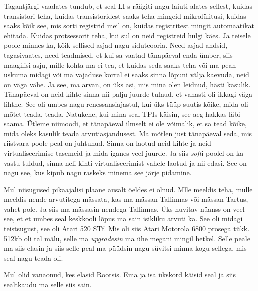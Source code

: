 Tagantjärgi  vaadates tundub, et  seal LI-s räägiti nagu laiuti alates sellest, 
kuidas transistori teha, kuidas transistoridest saaks teha mingeid 
mikrolülitusi, kuidas saaks kõik see, mis sorti registrid meil on, kuidas 
registritest mingit automaatikat ehitada. Kuidas protsessorit teha, kui sul on 
neid registreid hulgi käes. Ja  teisele  poole minnes ka, kõik sellised asjad 
nagu siduteooria. Need asjad andsid, tagasivaates, need teadmised, et kui sa 
vaatad tänapäeval enda ümber, siis maagilisi asju, mille kohta ma ei tea, et 
kuidas seda saaks teha või ma pean uskuma midagi või ma vajaduse korral ei 
saaks sinna lõpuni välja kaevuda, neid on väga vähe. Ja see, ma arvan, on üks 
asi, mis mina olen leidnud, hästi kasulik. Tänapäeval on neid kihte sinna nii 
palju juurde tulnud, et vanasti oli ikkagi väga lihtne. See oli umbes nagu 
renessansiajastul, kui üks tüüp suutis  kõike, mida oli mõtet teada, teada. 
Natukene, kui  mina seal TPIs käisin, see aeg hakkas läbi saama. Ütleme 
niimoodi, et tänapäeval ilmselt ei ole võimalik, et sa tead kõike, mida oleks 
kasulik teada arvutiasjandusest. Ma mõtlen just tänapäeval seda, mis riistvara 
poole peal on juhtunud. Sinna on laotud neid kihte ja neid virtualiseerimise 
tasemeid ja mida iganes veel juurde. Ja siis \emph{soft}i poolel on ka vastu 
tuldud, sinna neli kihti virtualiseerimist vahele laotud ja nii edasi. See on 
nagu see, kus kipub nagu raskeks minema see järje pidamine.


Mul niisugused pikaajalisi plaane ausalt öeldes ei olnud. Mlle meeldis teha, 
mulle meeldis nende arvutitega mässata, kas ma mässan Tallinnas või mässan 
Tartus, vahet pole. Ja siis ma mässasin nendega Tallinnas. Üks huvitav nüanss 
on veel see, et et umbes seal keskkooli lõpus ma sain isikliku arvuti ka. See 
oli midagi teistsugust, see oli Atari 520 STf. Mis 
oli siis Atari Motorola 6800 prosega tükk. 512kb oli tal mälu, selle ma 
\emph{upgradesin} ma ühe megani mingil hetkel. Selle peale ma siis elasin ja 
siis selle peal ma püüdsin nagu süvitsi minna kogu sellega, mis seal nagu teada 
oli. 



Mul olid vanaonud, kes elasid Rootsis. Ema ja isa ükskord käisid seal ja siis 
sealtkaudu ma selle siis sain. 


